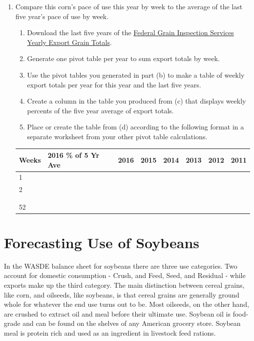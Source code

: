 \documentclass[]{book}
\providecommand{\tightlist}{%
  \setlength{\itemsep}{0pt}\setlength{\parskip}{0pt}}
\theoremstyle{definition}
\theoremstyle{definition}
\theoremstyle{remark}
\begin{document}
\begin{enumerate}
\def\labelenumi{\arabic{enumi}.}
\tightlist
\item
  Compare this corn's pace of use this year by week to the average of
  the last five year's pace of use by week.

  \begin{enumerate}
  \def\labelenumii{\alph{enumii}.}
  \tightlist
  \item
    Download the last five years of the
    \href{http://www.gipsa.usda.gov/fgis/exportgrain/default.aspx}{Federal
    Grain Inspection Services Yearly Export Grain Totals}.
  \item
    Generate one pivot table per year to sum export totals by week.
  \item
    Use the pivot tables you generated in part (b) to make a table of
    weekly export totals per year for this year and the last five years.
  \item
    Create a column in the table you produced from (c) that displays
    weekly percents of the five year average of export totals.
  \item
    Place or create the table from (d) according to the following format
    in a separate worksheet from your other pivot table calculations.
  \end{enumerate}

  \begin{longtable}[]{@{}llllllll@{}}
  \toprule
  Weeks & 2016 \% of 5 Yr Ave & 2016 & 2015 & 2014 & 2013 & 2012 &
  2011\tabularnewline
  \midrule
  \endhead
  1 & & & & & & &\tabularnewline
  2 & & & & & & &\tabularnewline
  & & & & & & &\tabularnewline
  & & & & & & &\tabularnewline
  52 & & & & & & &\tabularnewline
  \bottomrule
  \end{longtable}
\end{enumerate}

\chapter{Forecasting Use of Soybeans}\label{forecasting-use-of-soybeans}

In the WASDE balance sheet for soybeans there are three use categories.
Two account for domestic consumption - Crush, and Feed, Seed, and
Residual - while exports make up the third category. The main
distinction between cereal grains, like corn, and oilseeds, like
soybeans, is that cereal grains are generally ground whole for whatever
the end use turns out to be. Most oilseeds, on the other hand, are
crushed to extract oil and meal before their ultimate use. Soybean oil
is food-grade and can be found on the shelves of any American grocery
store. Soybean meal is protein rich and used as an ingredient in
livestock feed rations.
\end{document}
